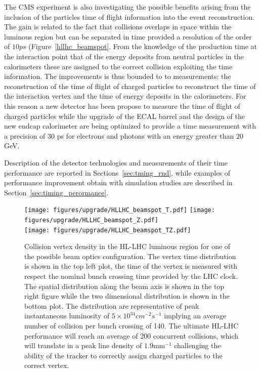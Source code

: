 The CMS experiment is also investigating the possible benefits arising from the inclusion of the particles
time of flight information into the event reconstruction. The gain is related to the fact that
collisions overlaps in space within the luminous region but can be separated in time provided a resolution of the
order of $10 ps$ (Figure~\ref{hllhc_beamspot}.
From the knowledge of the production time at the interaction point that of the energy deposits from neutral
particles in the calorimeters these are assigned to the correct collision exploiting the time information.
The improvements is thus bounded to
to measurements: the reconstruction of the time of flight of charged particles to reconstruct the time
of the interaction vertex and the time of energy deposits in the calorimeters. For this reason a new detector
has been propose to measure the time of flight of charged particles while the upgrade of the ECAL barrel and
the design of the new endcap calorimeter are being optimized to provide a time measurement with a precision
of $30$ ps for electrons and photons with an energy greater than $20$ GeV.

Description of the detector technologies and measurements of their time performance are reported in Sections~\ref{sec:tming_rnd},
while examples of performance improvement obtain with simulation studies are described in Section~\ref{sec:timing_perormance}.

\begin{figure}[h!]
  \centering
  \texttt{[image: figures/upgrade/HLLHC\_beamspot\_T.pdf]}
  \texttt{[image: figures/upgrade/HLLHC\_beamspot\_Z.pdf]} \\
  \texttt{[image: figures/upgrade/HLLHC\_beamspot\_TZ.pdf]}
  \caption{Collision vertex density in the HL-LHC luminous region for one of the possible beam optics configuration.
    The vertex time distribution is shown in the top left plot, the time of the vertex is measured with respect
    the nominal bunch crossing time provided by the LHC clock. The spatial distribution along the beam axis is shown in
    the top right figure while the two dimensional distribution is shown in the bottom plot.
    The distribution are representative of peak instantaneous luminosity of $5\times10^{34} cm^{-2}s^{-1}$ implying
    an average number of collision per bunch crossing of 140. The ultimate HL-LHC performance will reach an average of 200
    concurrent collisions, which will translate in a peak line density of $1.9$mm$^{-1}$ challenging the ability
    of the tracker to correctly assign charged particles to the correct vertex.}
  \label{fig:hllhc_beamspot}
\end{figure}


